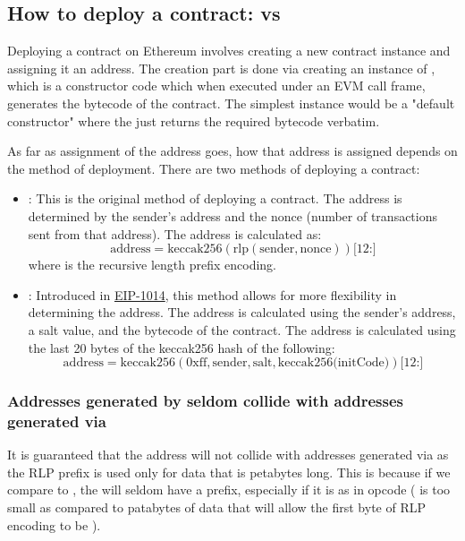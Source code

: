\subsection{How to deploy a contract:  vs }
Deploying a contract on Ethereum involves creating a new contract instance and assigning it an address. The creation part is done via creating an instance of , which is a constructor code which when executed under an EVM call frame, generates the bytecode of the contract. The simplest instance would be a "default constructor" where the  just returns the required bytecode verbatim.

As far as assignment of the address goes, how that address is assigned depends on the method of deployment. There are two methods of deploying a contract:
\begin{itemize}
    \item {}: This is the original method of deploying a contract. The address is determined by the sender's address and the nonce (number of transactions sent from that address). The address is calculated as:
    \[
    \text{address} = \text{keccak256}(\text{rlp}(\text{sender}, \text{nonce}))\text{[12:]}
    \]
    where  is the recursive length prefix encoding.
    
    \item {}: Introduced in \href{https://eips.ethereum.org/EIPS/eip-1014}{EIP-1014}, this method allows for more flexibility in determining the address. The address is calculated using the sender's address, a salt value, and the bytecode of the contract. The address is calculated using the last 20 bytes of the keccak256 hash of the following:
    \[
    \text{address} = \text{keccak256}(\text{0xff}, \text{sender}, \text{salt}, \text{keccak256(initCode)})\text{[12:]}
    \]
\end{itemize}

\subsubsection{Addresses generated by  seldom collide with addresses generated via }
It is guaranteed that the address will not collide with addresses generated via  as the  RLP prefix is used only for data that is petabytes long. This is because if we compare  to , the  will seldom have a  prefix, especially if it is as in  opcode ( is too small as compared to patabytes of data that will allow the first byte of RLP encoding to be ).

